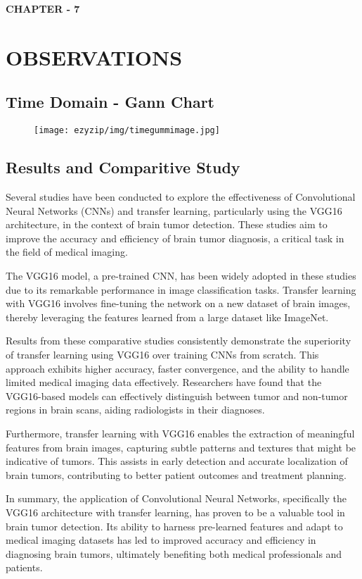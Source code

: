 \newpage
\begin{center}
    \textbf{\LARGE CHAPTER - 7}
\end{center}
\section{OBSERVATIONS}

\subsection{Time Domain - Gann Chart}
\begin{figure}[H]
	\centering
	 \texttt{[image: ezyzip/img/timegummimage.jpg]}
	
	\label{fig:polarization}
\end{figure}	

\subsection{Results and Comparitive Study}
 Several studies have been conducted to explore the effectiveness of Convolutional Neural Networks (CNNs) and transfer learning, particularly using the VGG16 architecture, in the context of brain tumor detection. These studies aim to improve the accuracy and efficiency of brain tumor diagnosis, a critical task in the field of medical imaging.

The VGG16 model, a pre-trained CNN, has been widely adopted in these studies due to its remarkable performance in image classification tasks. Transfer learning with VGG16 involves fine-tuning the network on a new dataset of brain images, thereby leveraging the features learned from a large dataset like ImageNet.

Results from these comparative studies consistently demonstrate the superiority of transfer learning using VGG16 over training CNNs from scratch. This approach exhibits higher accuracy, faster convergence, and the ability to handle limited medical imaging data effectively. Researchers have found that the VGG16-based models can effectively distinguish between tumor and non-tumor regions in brain scans, aiding radiologists in their diagnoses.

Furthermore, transfer learning with VGG16 enables the extraction of meaningful features from brain images, capturing subtle patterns and textures that might be indicative of tumors. This assists in early detection and accurate localization of brain tumors, contributing to better patient outcomes and treatment planning.

In summary, the application of Convolutional Neural Networks, specifically the VGG16 architecture with transfer learning, has proven to be a valuable tool in brain tumor detection. Its ability to harness pre-learned features and adapt to medical imaging datasets has led to improved accuracy and efficiency in diagnosing brain tumors, ultimately benefiting both medical professionals and patients.








